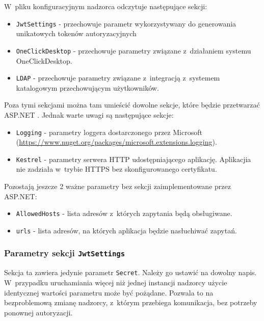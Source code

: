 \documentclass[../opis-rozwiazania.tex]{subfiles}
\begin{document}
W~pliku konfiguracyjnym nadzorca odczytuje następujące sekcji:
\begin{itemize}
  \item \texttt{JwtSettings} - przechowuje parametr wykorzystywany do generowania unikatowych tokenów autoryzacyjnych
  \item \texttt{OneClickDesktop} - przechowuje parametry związane z~działaniem systemu OneClickDesktop.
  \item \texttt{LDAP} - przechowuje parametry związane z~integracją z~systemem katalogowym przechowującym użytkowników.
\end{itemize}
Poza tymi sekcjami można tam umieścić dowolne sekcje, które będzie przetwarzać ASP.NET \parencite{asp-conf}.
Jednak warte uwagi są następujące sekcje:
\begin{itemize}
  \item \texttt{Logging} - parametry loggera dostarczonego przez Microsoft (\url{https://www.nuget.org/packages/microsoft.extensions.logging}).
  \item \texttt{Kestrel} - parametry serwera HTTP udostępniającego aplikację. Aplikacjia nie zadziała w~trybie HTTPS bez skonfigurowanego certyfikatu.
\end{itemize}
\noindent
Pozostają jeszcze 2 ważne parametry bez sekcji zaimplementowane przez ASP.NET:
\begin{itemize}
  \item \texttt{AllowedHosts} - lista adresów z~których zapytania będą obsługiwane.
  \item \texttt{urls} - lista adresów, na których aplikacja będzie nasłuchiwać zapytań.
\end{itemize}

\subsubsection{Parametry sekcji \texttt{JwtSettings}}
Sekcja ta zawiera jedynie parametr \texttt{Secret}. Należy go ustawić na dowolny napis. W~przypadku uruchamiania więcej niż jednej instancji nadzorcy użycie identycznej wartości parametru może być pożądane. Pozwala to na bezproblemową zmianę nadzorcy, z~którym przebiega komunikacja, bez potrzeby ponownej autoryzacji.
\end{document}
